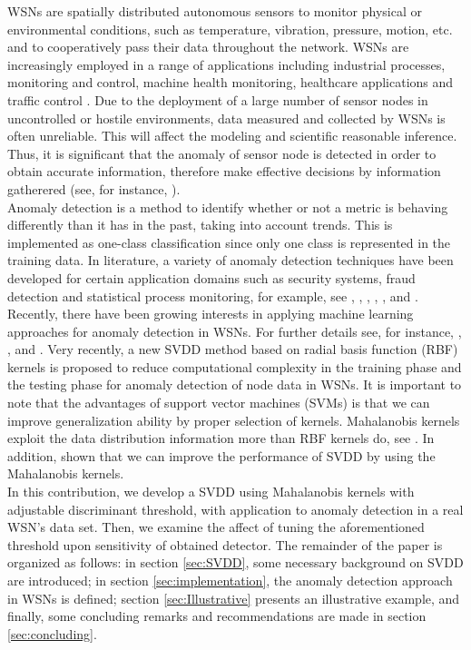 \documentclass[conference]{IEEEtran}
\theoremstyle{problemstyle}
\begin{document}
WSNs are spatially distributed autonomous sensors to monitor physical or environmental conditions, such as temperature, vibration, pressure, motion, etc. and to cooperatively pass their data throughout the network. WSNs are increasingly employed in a range of applications including industrial processes, monitoring and control, machine health monitoring, healthcare applications and traffic control \cite{Xie2011}. Due to the deployment of a large number of sensor nodes in uncontrolled or hostile environments, data measured and collected by WSNs is often  unreliable. This will affect the modeling and scientific reasonable inference. Thus, it is significant that the anomaly of sensor node is detected in order to obtain accurate information, therefore make effective decisions by information gatherered (see, for instance, \cite{sharma2010sensor}).\\

Anomaly detection is a method to identify whether or not a metric is behaving differently than it has in the past, taking into account trends. This is implemented as one-class classification since only one class is represented in the training data. In literature, a variety of anomaly detection techniques have been developed for certain application domains such as security systems, fraud detection and statistical process monitoring, for example, see \cite{ilonen2006gaussian}, \cite{clifton2011novelty}, \cite{Tran2015a}, \cite{Tran2015b}, \cite{Chandola2016}, \cite{Tran2016} and \cite{Tran2016c}. Recently, there have been growing interests in applying machine learning approaches for anomaly detection in WSNs. For further details see, for instance, \cite{sharma2010sensor}, \cite{Xie2011}, \cite{Rajasegarar2014} and \cite{Chandola2016}. Very recently, a new SVDD method \cite{Tax2004} based on radial basis function (RBF) kernels is proposed \cite{feng2017new} to reduce computational complexity in the training phase and the testing phase for anomaly detection of node data in WSNs. It is important to note that the advantages of support vector machines (SVMs) \cite{Vapnik1998} is that we can improve generalization ability by proper selection of kernels. Mahalanobis kernels exploit the data distribution information more than RBF kernels do, see \cite{abe2005training}. In addition, \cite{maboudou2016monitoring} shown that we can improve the performance of SVDD by using the Mahalanobis kernels.\\

In this contribution, we develop a SVDD using Mahalanobis kernels with adjustable discriminant threshold, with application to anomaly detection in a real WSN's data set. Then, we examine the affect of tuning the aforementioned threshold upon sensitivity of obtained detector. The remainder of the paper is organized as follows: in section \ref{sec:SVDD}, some necessary background on SVDD are introduced; in section \ref{sec:implementation}, the anomaly detection approach in WSNs is defined; section \ref{sec:Illustrative} presents an illustrative example, and finally, some concluding remarks and recommendations are made in section \ref{sec:concluding}.
\end{document}
